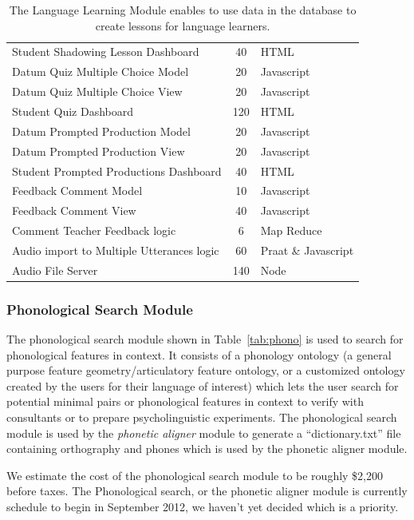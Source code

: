 \documentclass[12pt]{article}
\begin{document}
\begin{table}[htbp]
\begin{center}
\begin{tabular}{ | lcl | }
Student Shadowing Lesson Dashboard &  40 & HTML \\ 
Datum Quiz Multiple Choice Model  & 20  & Javascript \\ 
Datum Quiz Multiple Choice View  &  20  & Javascript \\ 
Student Quiz Dashboard  & 120  & HTML \\ 
Datum Prompted Production Model  & 20  & Javascript \\ 
Datum Prompted Production View  & 20  & Javascript \\ 
Student Prompted Productions Dashboard  &  40  & HTML \\ 
Feedback Comment Model  & 10  & Javascript \\ 
Feedback Comment View  & 40  & Javascript \\ 
Comment Teacher Feedback logic & 6  & Map Reduce \\ 
Audio import to Multiple Utterances logic   & 60  & Praat \& Javascript \\ 
Audio File Server  & 140  & Node \\ 
\hline
  \end{tabular}
 \caption{The Language Learning Module enables to use data in the database to create lessons for language learners.  }
  \label{tab:langlearn}
  \end{center}
\end{table}



\subsubsection{Phonological Search Module}
The phonological search module shown in Table~\ref{tab:phono} is used to search for phonological features in context. It consists of a phonology ontology (a general purpose feature geometry/articulatory feature ontology, or a customized ontology created by the users for their language of interest) which lets the user search for potential minimal pairs or phonological features in context to verify with consultants or to prepare psycholinguistic experiments. The phonological search module is used by the {\it  phonetic aligner} module to generate a ``dictionary.txt'' file containing orthography and phones which is used by the phonetic aligner module.

We estimate the cost of the phonological search module to be roughly \$2,200 before taxes. The Phonological search, or the phonetic aligner module is currently schedule to begin in September 2012, we haven't yet decided which is a priority.
\end{document}
